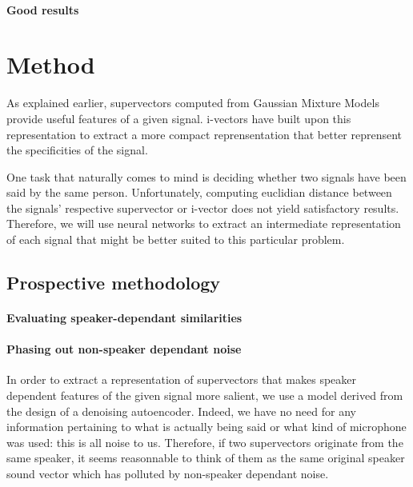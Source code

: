\documentclass[conference]{IEEEtran}
\begin{document}
\paragraph{Good results}

\section{Method}

As explained earlier, supervectors computed from Gaussian Mixture Models provide
useful features of a given signal. i-vectors have built upon this representation
to extract a more compact reprensentation that better reprensent the
specificities of the signal.

One task that naturally comes to mind is deciding whether two signals have been
said by the same person. Unfortunately, computing euclidian distance between the signals'
respective supervector or i-vector does not yield satisfactory results.
Therefore, we will use neural networks to extract an intermediate representation
of each signal that might be better suited to this particular problem.

\subsection{Prospective methodology}

\paragraph{Evaluating speaker-dependant similarities}


\paragraph{Phasing out non-speaker dependant noise}

In order to extract a representation of supervectors that makes speaker
dependent features of the given signal more salient, we use a model derived from
the design of a denoising autoencoder. Indeed, we have no need for any
information pertaining to what is actually being said or what kind of microphone
was used: this is all noise to us. Therefore, if two supervectors originate from
the same speaker, it seems reasonnable to think of them as the same original \og
speaker\fg{} sound vector which has polluted by non-speaker dependant noise.
\end{document}
